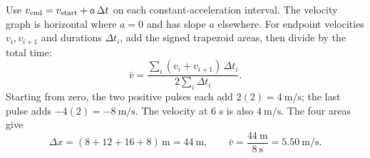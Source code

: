 \begin{problem}[25 pts]
\end{problem}
\begin{solution}
Use $v_{\rm end}=v_{\rm start}+a\,\Delta t$ on each constant-acceleration
interval. The velocity graph is horizontal where $a=0$ and has slope $a$
elsewhere.
For endpoint velocities $v_i,v_{i+1}$ and durations $\Delta t_i$,
add the signed trapezoid areas, then divide by the total time:
\[
\bar v=
\frac{\sum_i(v_i+v_{i+1})\,\Delta t_i}
{2\sum_i\Delta t_i}.
\]
Starting from zero, the two positive pulses each add
$2(2)=\qty{4}{\metre\per\second}$; the last pulse adds
$-4(2)=-\qty{8}{\metre\per\second}$.
The velocity at 6 s is also $\qty{4}{\metre\per\second}$.
The four areas give
\[
\Delta x=(8+12+16+8)\,\unit{\metre}=\qty{44}{\metre},\qquad
\bar v=\frac{\qty{44}{\metre}}{\qty{8}{\second}}
=\qty{5.50}{\metre\per\second}.
\]
\end{solution}

